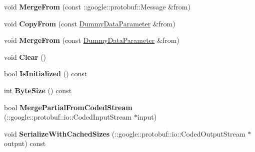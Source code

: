 \begin{DoxyCompactItemize}
\item 
\mbox{\label{classcaffe_1_1_dummy_data_parameter_ae5028fef94da873eda440a049239e15b}} 
void {\bfseries Merge\+From} (const \+::google\+::protobuf\+::\+Message \&from)
\item 
\mbox{\label{classcaffe_1_1_dummy_data_parameter_a29e79bfdd9b0f0bd85663d18c4d7d1ff}} 
void {\bfseries Copy\+From} (const \mbox{\hyperlink{classcaffe_1_1_dummy_data_parameter}{Dummy\+Data\+Parameter}} \&from)
\item 
\mbox{\label{classcaffe_1_1_dummy_data_parameter_afa19a88e08c9bf8a979e8f481b5d8386}} 
void {\bfseries Merge\+From} (const \mbox{\hyperlink{classcaffe_1_1_dummy_data_parameter}{Dummy\+Data\+Parameter}} \&from)
\item 
\mbox{\label{classcaffe_1_1_dummy_data_parameter_a4e171993e62681a1e9e4d270c0b5b12c}} 
void {\bfseries Clear} ()
\item 
\mbox{\label{classcaffe_1_1_dummy_data_parameter_a51d415ec15fe8961bd3ff21d7d7011a6}} 
bool {\bfseries Is\+Initialized} () const
\item 
\mbox{\label{classcaffe_1_1_dummy_data_parameter_abe5c3bb25d15065a9a1bd5a1628a44fc}} 
int {\bfseries Byte\+Size} () const
\item 
\mbox{\label{classcaffe_1_1_dummy_data_parameter_a85fecf138cc8fe333cb9295461cd423f}} 
bool {\bfseries Merge\+Partial\+From\+Coded\+Stream} (\+::google\+::protobuf\+::io\+::\+Coded\+Input\+Stream $\ast$input)
\item 
\mbox{\label{classcaffe_1_1_dummy_data_parameter_ab8ebe6146f7b88c537758015f54c5177}} 
void {\bfseries Serialize\+With\+Cached\+Sizes} (\+::google\+::protobuf\+::io\+::\+Coded\+Output\+Stream $\ast$output) const
\item 
\mbox{\label{classcaffe_1_1_dummy_data_parameter_a1317a1bf14430bcdb73ed86e429f392b}} 

\end{DoxyCompactItemize}
